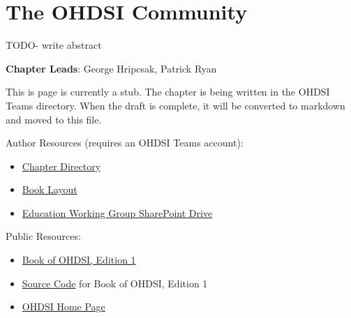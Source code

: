 \documentclass[
  letterpaper,
  paper=7in:10in,
  pagesize=pdftex,
  headinclude=on,
  footinclude=on,
  12pt]{scrbook}
\providecommand{\tightlist}{%
  \setlength{\itemsep}{0pt}\setlength{\parskip}{0pt}}\usepackage{longtable,booktabs,array}
\begin{document}
\chapter{The OHDSI Community}\label{sec-ohdsi-community}

TODO- write abstract

\hfill\break

\textbf{Chapter Leads}: George Hripcsak, Patrick Ryan

\begin{tcolorbox}[enhanced jigsaw, opacitybacktitle=0.6, coltitle=black, colback=white, bottomrule=.15mm, bottomtitle=1mm, title=\textcolor{quarto-callout-note-color}{\faInfo}\hspace{0.5em}{Note}, titlerule=0mm, rightrule=.15mm, colbacktitle=quarto-callout-note-color!10!white, colframe=quarto-callout-note-color-frame, toptitle=1mm, arc=.35mm, left=2mm, breakable, opacityback=0, leftrule=.75mm, toprule=.15mm]

This is page is currently a stub. The chapter is being written in the
OHDSI Teams directory. When the draft is complete, it will be converted
to markdown and moved to this file.

Author Resources (requires an OHDSI Teams account):

\begin{itemize}
\tightlist
\item
  \href{https://ohdsiorg.sharepoint.com/sites/Workgroup-EducationWorkingGroup/Shared\%20Documents/Forms/AllItems.aspx?id=\%2Fsites\%2FWorkgroup\%2DEducationWorkingGroup\%2FShared\%20Documents\%2FSection\%20I\%20\%2D\%20Propaganda\%2FChapter\%201\%20The\%20OHDSI\%20Community&viewid=05fec2cc\%2Dec8a\%2D4d04\%2Db565\%2Dcf1289b96f67}{Chapter
  Directory}
\item
  \href{https://ohdsiorg.sharepoint.com/:x:/r/sites/Workgroup-EducationWorkingGroup/_layouts/15/Doc2.aspx?action=edit&sourcedoc=\%7B1fa31e39-1c5f-4918-b878-609ebd9810b3\%7D&wdOrigin=TEAMS-WEB.teamsSdk_ns.rwc&wdExp=TEAMS-TREATMENT&wdhostclicktime=1748104477731&web=1}{Book
  Layout}
\item
  \href{https://ohdsiorg.sharepoint.com/sites/Workgroup-EducationWorkingGroup/Shared\%20Documents/Forms/AllItems.aspx?viewid=05fec2cc\%2Dec8a\%2D4d04\%2Db565\%2Dcf1289b96f67}{Education
  Working Group SharePoint Drive}
\end{itemize}

Public Resources:

\begin{itemize}
\tightlist
\item
  \href{https://ohdsi.github.io/TheBookOfOhdsi/}{Book of OHDSI, Edition
  1}
\item
  \href{https://github.com/OHDSI/TheBookOfOhdsi}{Source Code} for Book
  of OHDSI, Edition 1
\item
  \href{https://ohdsi.org/}{OHDSI Home Page}
\end{itemize}

\end{tcolorbox}
\end{document}
